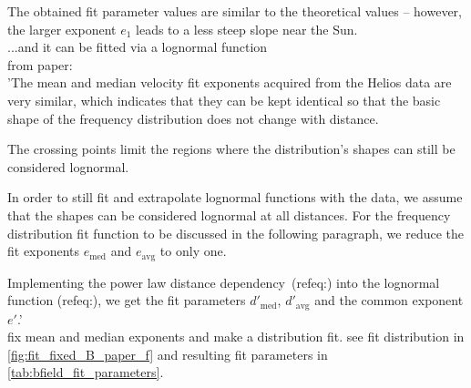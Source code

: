 The obtained fit parameter values are similar to the theoretical values -- however, the larger exponent $e_1$ leads to a less steep slope near the Sun.\\

...and it can be fitted via a lognormal function\\

from paper:\\
'The mean and median velocity fit exponents acquired from the Helios data are very similar, which indicates that they can be kept identical so that the basic shape of the frequency distribution does not change with distance.

The crossing points limit the regions where the distribution's shapes can still be considered lognormal.

In order to still fit and extrapolate lognormal functions with the data, we assume that the shapes can be considered lognormal at all distances. For the frequency distribution fit function to be discussed in the following paragraph, we reduce the fit exponents $e_\text{med}$ and $e_\text{avg}$ to only one.

Implementing the power law distance dependency~(ref{eq:}) into the lognormal function (ref{eq:}), we get the fit parameters $d'_\text{med}$, $d'_\text{avg}$ and the common exponent $e'$.'\\


fix mean and median exponents and make a distribution fit. see fit distribution in \autoref{fig:fit_fixed_B_paper_f} and resulting fit parameters in \autoref{tab:bfield_fit_parameters}.\\
\begin{figure}[htb]
\end{figure}

